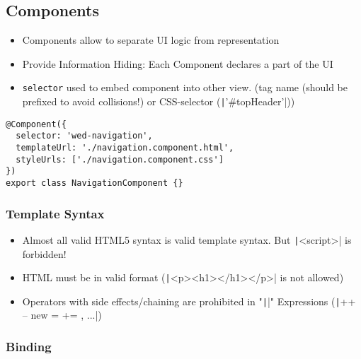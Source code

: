 \begin{multicols*}{2}
\subsection{Components}
\begin{itemize}
    \item Components allow to separate UI logic from representation
    \item Provide Information Hiding: Each Component declares a part of the UI
    \item \lstinline|selector| used to embed component into other view. (tag name (should be prefixed to avoid collisions!) or CSS-selector (\texttt|'#topHeader'|))
\end{itemize}

\begin{verbatim}
@Component({
  selector: 'wed-navigation',
  templateUrl: './navigation.component.html',
  styleUrls: ['./navigation.component.css']
})
export class NavigationComponent {}
\end{verbatim}

\subsubsection{Template Syntax}
\begin{itemize}
    \item Almost all valid HTML5 syntax is valid template syntax. But \texttt|<script>| is forbidden!
    \item HTML must be in valid format (\texttt|<p><h1></h1></p>| is not allowed)
    \item Operators with side effects/chaining are prohibited in "\texttt|{{}}|" Expressions (\texttt|++ -- new = += , ...|)
\end{itemize}

\subsubsection{Binding}


\end{multicols*}
